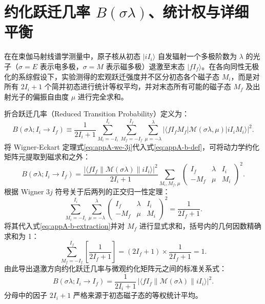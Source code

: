 \section{约化跃迁几率 $B(\sigma\lambda)$、统计权与详细平衡}\label{sec:appA-5}

在在束伽马射线谱学测量中，原子核从初态 $|i I_i\rangle$ 自发辐射一个多极阶数为 $\lambda$ 的光子（$\sigma = E$ 表示电多极，$\sigma = M$ 表示磁多极）退激至末态 $|f I_f\rangle$。在各向同性无极化的系综假设下，实验测得的宏观跃迁强度并不区分初态各个磁子态 $M_i$，而是对所有 $2I_i + 1$ 个简并初态进行统计等权平均，并对末态所有可能的磁子态 $M_f$ 及出射光子的偏振自由度 $\mu$ 进行完全求和。

折合跃迁几率（Reduced Transition Probability）定义为：
\begin{equation}\label{eq:appA-b-def}
B(\sigma\lambda; I_i \to I_f) \equiv \frac{1}{2I_i + 1} \sum_{M_i=-I_i}^{I_i} \sum_{M_f=-I_f}^{I_f} \sum_{\mu=-\lambda}^\lambda |\langle f I_f M_f | \mathcal{M}(\sigma\lambda, \mu) | i I_i M_i \rangle|^2 .
\end{equation}
将 Wigner-Eckart 定理式\eqref{eq:appA-we-3j}代入式\eqref{eq:appA-b-def}，可将动力学约化矩阵元提取到磁求和之外：
\begin{equation}\label{eq:appA-b-extraction}
B(\sigma\lambda; I_i \to I_f) = \frac{|\langle f I_f \| \mathcal{M}(\sigma\lambda) \| i I_i \rangle|^2}{2I_i + 1} \sum_{M_i, M_f, \mu} \begin{pmatrix} I_f & \lambda & I_i \\ -M_f & \mu & M_i \end{pmatrix}^2 .
\end{equation}
根据 Wigner $3j$ 符号关于后两列的正交归一性定理：
\begin{equation}\label{eq:appA-3j-ortho-sum}
\sum_{M_i=-I_i}^{I_i} \sum_{\mu=-\lambda}^\lambda \begin{pmatrix} I_f & \lambda & I_i \\ -M_f & \mu & M_i \end{pmatrix}^2 = \frac{1}{2I_f + 1} .
\end{equation}
将其代入式\eqref{eq:appA-b-extraction}并对 $M_f$ 进行显式求和，括号内的几何因数精确求和为 1：
\begin{equation}\label{eq:appA-b-sum-unity}
\sum_{M_f=-I_f}^{I_f} \left[ \frac{1}{2I_f + 1} \right] = (2I_f + 1) \times \frac{1}{2I_f + 1} = 1 .
\end{equation}
由此导出退激方向约化跃迁几率与微观约化矩阵元之间的标准关系式：
\begin{equation}\label{eq:appA-b-standard-down}
B(\sigma\lambda; I_i \to I_f) = \frac{1}{2I_i + 1} \, |\langle f I_f \| \mathcal{M}(\sigma\lambda) \| i I_i \rangle|^2 .
\end{equation}
分母中的因子 $2I_i + 1$ 严格来源于初态磁子态的等权统计平均。

